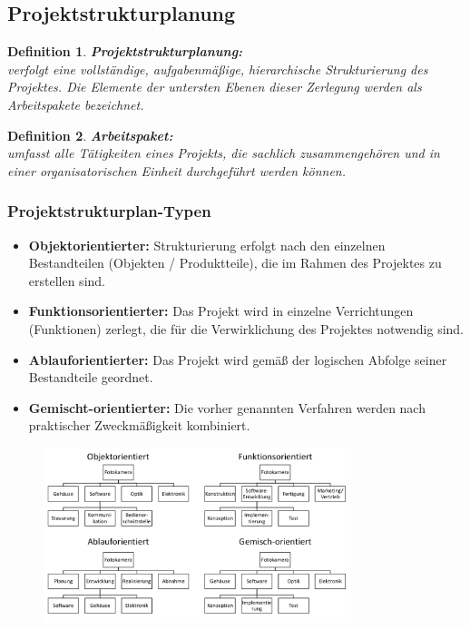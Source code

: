\documentclass[11pt,a4paper]{article}
\newenvironment{de}[1]
{\begin{mdframed}[style=de]\begin{mydef}{\textbf{#1:}}\\} 
{\end{mydef}\end{mdframed}}
\newtheorem{mydef}{Definition}
\begin{document}
\subsection{Projektstrukturplanung}

\begin{de}{Projektstrukturplanung}
verfolgt eine vollständige, aufgabenmäßige,
hierarchische Strukturierung des Projektes. Die Elemente der untersten
Ebenen dieser Zerlegung werden als Arbeitspakete bezeichnet.
\end{de}

\begin{de}{Arbeitspaket}
umfasst alle Tätigkeiten eines Projekts, die sachlich
zusammengehören und in einer organisatorischen Einheit durchgeführt
werden können.
\end{de}

\subsubsection{Projektstrukturplan-Typen}
\begin{itemize}
	\item \textbf{Objektorientierter:} Strukturierung
erfolgt nach den
einzelnen
Bestandteilen
(Objekten /
Produktteile), die im
Rahmen des
Projektes zu
erstellen sind.
	\item \textbf{Funktionsorientierter:} Das Projekt wird in
einzelne
Verrichtungen
(Funktionen) zerlegt,
die für die
Verwirklichung des
Projektes notwendig
sind.
	\item \textbf{Ablauforientierter:} Das Projekt wird
gemäß der logischen
Abfolge seiner
Bestandteile
geordnet.

	\item \textbf{Gemischt-orientierter:} Die vorher
genannten
Verfahren werden
nach praktischer
Zweckmäßigkeit
kombiniert.
\end{itemize}

\begin{figure}[H]
	\includegraphics[width=0.8\textwidth]{strukturplan}
\end{figure}
\end{document}
